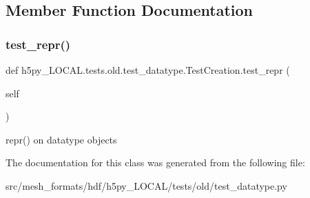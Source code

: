 \subsection{Member Function Documentation}
\mbox{\label{classh5py__LOCAL_1_1tests_1_1old_1_1test__datatype_1_1TestCreation_ab9a3ce46ce248ebab53ad0014b7f9e06}} 
\subsubsection{\texorpdfstring{test\+\_\+repr()}{test\_repr()}}
{\footnotesize\ttfamily def h5py\+\_\+\+L\+O\+C\+A\+L.\+tests.\+old.\+test\+\_\+datatype.\+Test\+Creation.\+test\+\_\+repr (\begin{DoxyParamCaption}\item[{}]{self }\end{DoxyParamCaption})}

\begin{DoxyVerb}repr() on datatype objects \end{DoxyVerb}
 

The documentation for this class was generated from the following file\+:\begin{DoxyCompactItemize}
\item 
src/mesh\+\_\+formats/hdf/h5py\+\_\+\+L\+O\+C\+A\+L/tests/old/test\+\_\+datatype.\+py\end{DoxyCompactItemize}
